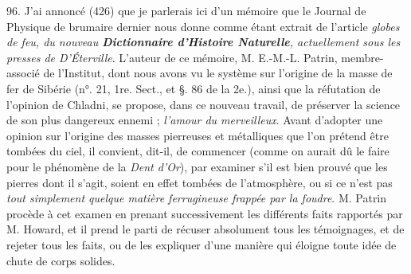 \documentclass[a4paper, 11pt, oneside, polutonikogreek, french]{article}
\begin{document}
96. J'ai annoncé (426) que je parlerais ici d'un mémoire que le Journal de Physique de brumaire dernier nous donne comme étant extrait de l'article \emph{globes de feu, du nouveau \textbf{Dictionnaire d'Histoire Naturelle}, actuellement sous les presses de D’Éterville}. L'auteur de ce mémoire, M. E.-M.-L. Patrin, membre-associé de l'Institut, dont nous avons vu le système sur l'origine de la masse de fer de Sibérie (n°. 21, 1re. Sect., et §. 86 de la 2e.), ainsi que la réfutation de l'opinion de Chladni, se propose, dans ce nouveau travail, de préserver la science de son plus dangereux ennemi ; \emph{l'amour du merveilleux}. \og Avant d'adopter une opinion sur l'origine des masses pierreuses et métalliques que l'on prétend être tombées du ciel, il convient, dit-il, de commencer (comme on aurait dû le faire pour le phénomène de la \emph{Dent d'Or}), par examiner s'il est bien prouvé que les pierres dont il s'agit, soient en effet tombées de l'atmosphère, ou si ce n'est pas \emph{tout simplement quelque matière ferrugineuse frappée par la foudre}. \fg M. Patrin procède à cet examen en prenant successivement les différents faits rapportés par M. Howard, et il prend le parti de récuser absolument tous les témoignages, et de rejeter tous les faits, ou de les expliquer d'une manière qui éloigne toute idée de chute de corps solides.
\end{document}
